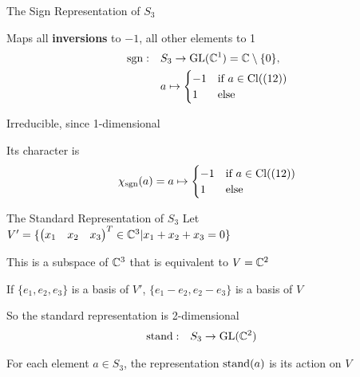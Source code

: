 \begin{frame}{The Sign Representation of $S_3$}
    \large
    
    Maps all \textbf{inversions} to $-1$, all other elements to 1
    \pause
    \begin{align*}
        \operatorname{sgn}: \quad & S_3 \to \operatorname{GL}(\mathbb{C}^1) = \mathbb{C} \setminus \{0\}, \\
        & a \mapsto \begin{cases}
            -1 & \text{if } a \in \operatorname{Cl}((12)) \\
            1 & \text{else}
        \end{cases}
    \end{align*}

    \pause
    Irreducible, since 1-dimensional
    
    \pause
    Its character is
    \begin{align*}
        \chi_{\operatorname{sgn}}(a) = a \mapsto \begin{cases}
            -1 & \text{if } a \in \operatorname{Cl}((12)) \\
            1 & \text{else}
        \end{cases}
    \end{align*}
\end{frame}

\begin{frame}{The Standard Representation of $S_3$}
    \large
    Let $V' = \{\begin{pmatrix}
        x_1 & x_2 & x_3
    \end{pmatrix}^T \in \mathbb{C}^3 | x_1 + x_2 + x_3 = 0\}$
    
    \pause
    This is a subspace of $\mathbb{C}^3$ that is equivalent to $V = \mathbb{C}^2$

    \pause
    If $\{e_1, e_2, e_3\}$ is a basis of $V'$,
    $\{e_1 - e_2, e_2 - e_3\}$ is a basis of $V$
    
    \vspace{1em}
    \pause
    So the standard representation is 2-dimensional
    \begin{align*}
        \operatorname{stand}: \quad & S_3 \to \operatorname{GL}(\mathbb{C}^2)
    \end{align*}
    
    \pause
    For each element $a \in S_3$, the representation $\operatorname{stand}(a)$ is its action on $V$
\end{frame}

